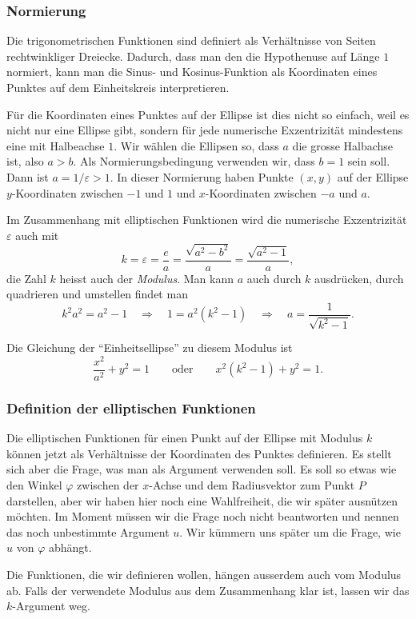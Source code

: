 %
%
\subsubsection{Normierung}
Die trigonometrischen Funktionen sind definiert als Verhältnisse 
von Seiten rechtwinkliger Dreiecke.
Dadurch, dass man den die Hypothenuse auf Länge $1$ normiert, 
kann man die Sinus- und Kosinus-Funktion als Koordinaten eines
Punktes auf dem Einheitskreis interpretieren.

Für die Koordinaten eines Punktes auf der Ellipse ist dies nicht so einfach,
weil es nicht nur eine Ellipse gibt, sondern für jede numerische Exzentrizität
mindestens eine mit Halbeachse $1$.
Wir wählen die Ellipsen so, dass $a$ die grosse Halbachse ist, also $a>b$.
Als Normierungsbedingung verwenden wir, dass $b=1$ sein soll.
Dann ist $a=1/\varepsilon>1$.
In dieser Normierung haben Punkte $(x,y)$ auf der Ellipse $y$-Koordinaten
zwischen $-1$ und $1$ und $x$-Koordinaten zwischen $-a$ und $a$.

Im Zusammenhang mit elliptischen Funktionen wird die numerische Exzentrizität
$\varepsilon$ auch mit
\[
k
=
\varepsilon
=
\frac{e}{a}
=
\frac{\sqrt{a^2-b^2}}{a}
=
\frac{\sqrt{a^2-1}}{a},
\]
die Zahl $k$ heisst auch der {\em Modulus}.
Man kann $a$ auch durch $k$ ausdrücken, durch quadrieren und umstellen
findet man
\[
k^2a^2 = a^2-1
\quad\Rightarrow\quad
1=a^2(k^2-1)
\quad\Rightarrow\quad
a=\frac{1}{\sqrt{k^2-1}}.
\]

Die Gleichung der ``Einheitsellipse'' zu diesem Modulus ist
\[
\frac{x^2}{a^2}+y^2=1
\qquad\text{oder}\qquad
x^2(k^2-1) + y^2 = 1.
\]

%
%
\subsubsection{Definition der elliptischen Funktionen}
Die elliptischen Funktionen für einen Punkt auf der Ellipse mit Modulus $k$
können jetzt als Verhältnisse der Koordinaten des Punktes definieren.
Es stellt sich aber die Frage, was man als Argument verwenden soll.
Es soll so etwas wie den Winkel $\varphi$ zwischen der $x$-Achse und dem
Radiusvektor zum Punkt $P$
darstellen, aber wir haben hier noch eine Wahlfreiheit, die wir später
ausnützen möchten.
Im Moment müssen wir die Frage noch nicht beantworten und nennen das
noch unbestimmte Argument $u$.
Wir kümmern uns später um die Frage, wie $u$ von $\varphi$ abhängt.

Die Funktionen, die wir definieren wollen, hängen ausserdem auch 
vom Modulus ab.
Falls der verwendete Modulus aus dem Zusammenhang klar ist, lassen
wir das $k$-Argument weg.

